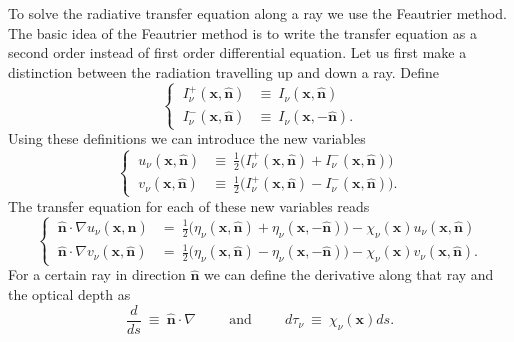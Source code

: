 \documentclass[]{article}
\begin{document}
To solve the radiative transfer equation along a ray we use the Feautrier method. The basic idea of the Feautrier method is to write the transfer equation as a second order instead of first order differential equation. Let us first make a distinction between the radiation travelling up and down a ray. Define
\begin{equation}
\begin{cases}
\ I^{+}_{\nu}(\textbf{x},\hat{\textbf{n}})  &\equiv \ I_{\nu}(\textbf{x},\hat{\textbf{n}}) \\
\ I^{-}_{\nu}(\textbf{x},\hat{\textbf{n}})  &\equiv \ I_{\nu}(\textbf{x},-\hat{\textbf{n}}) .
\end{cases}
\end{equation}
Using these definitions we can introduce the new variables
\begin{equation}
\begin{cases}
\ u_{\nu}(\textbf{x},\hat{\textbf{n}})  &\equiv \ \frac{1}{2}\big( I^{+}_{\nu}(\textbf{x},\hat{\textbf{n}}) + I^{-}_{\nu}(\textbf{x},\hat{\textbf{n}}) \big) \\
\ v_{\nu}(\textbf{x},\hat{\textbf{n}})  &\equiv \ \frac{1}{2}\big( I^{+}_{\nu}(\textbf{x},\hat{\textbf{n}}) - I^{-}_{\nu}(\textbf{x},\hat{\textbf{n}}) \big) .
\end{cases}
\end{equation}
The transfer equation for each of these new variables reads
\begin{equation}
\begin{cases}
\ \hat{\textbf{n}} \cdot \nabla u_{\nu}(\textbf{x},\hat{\textbf{n}}) &= \ \frac{1}{2} \big( \eta_{\nu}(\textbf{x},\hat{\textbf{n}}) + \eta_{\nu}(\textbf{x},-\hat{\textbf{n}}) \big) - \chi_{\nu}(\textbf{x}) u_{\nu}(\textbf{x},\hat{\textbf{n}}) \\
\ \hat{\textbf{n}} \cdot \nabla v_{\nu}(\textbf{x},\hat{\textbf{n}}) &= \ \frac{1}{2} \big( \eta_{\nu}(\textbf{x},\hat{\textbf{n}}) - \eta_{\nu}(\textbf{x},-\hat{\textbf{n}}) \big) - \chi_{\nu}(\textbf{x}) v_{\nu}(\textbf{x},\hat{\textbf{n}}) .
\end{cases}
\end{equation}
For a certain ray in direction $\hat{\textbf{n}}$ we can define the derivative along that ray and the optical depth as
\begin{equation}
\frac{d}{ds} \ \equiv \ \hat{\textbf{n}} \cdot \nabla \hspace{1cm} \text{and} \hspace{1cm} d\tau_{\nu} \ \equiv \ \chi_{\nu}(\textbf{x}) ds.
\end{equation}
\end{document}
